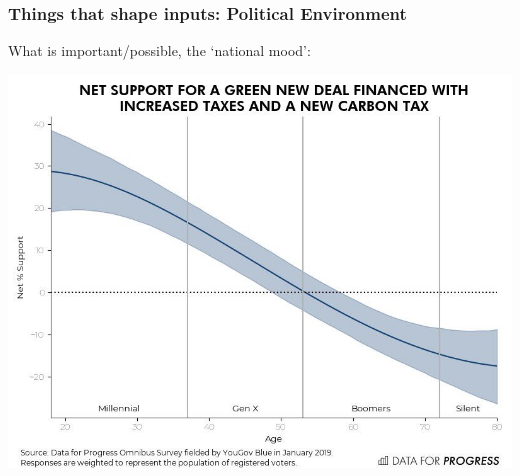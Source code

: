 \documentclass[aspectratio=169]{beamer}
\theoremstyle{principle}
\begin{document}
\begin{frame}
\frametitle{Things that shape inputs: Political Environment}
What is important/possible, the `national mood':
    \begin{center}
     \includegraphics[scale=0.3]{age-gnd.jpeg}
     \end{center}

\end{frame}
\end{document}

